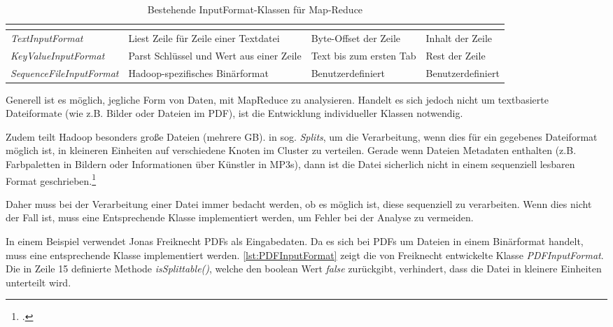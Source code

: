 \begin{table}[h]
	\centering
	\begin{tabularx}{\textwidth}{| l | X | X | X |}
		\hline
		\rowcolor[HTML]{3531FF} 
		\multicolumn{1}{|l|}{\cellcolor[HTML]{4F88BB}{\color[HTML]{FFFFFF} {\bf Klasse}}} & \multicolumn{1}{l|}{\cellcolor[HTML]{4F88BB}{\color[HTML]{FFFFFF} {\bf Beschreibung}}} & \multicolumn{1}{l|}{\cellcolor[HTML]{4F88BB}{\color[HTML]{FFFFFF} {\bf Key}}} & \multicolumn{1}{l|}{\cellcolor[HTML]{4F88BB}{\color[HTML]{FFFFFF} {\bf Value}}} \\ \hline
		\textit{TextInputFormat} & Liest Zeile für Zeile einer Textdatei & Byte-Offset der Zeile & Inhalt der Zeile \\  \hline
		\textit{KeyValueInputFormat} & Parst Schlüssel und Wert aus einer Zeile & Text bis zum ersten Tab & Rest der Zeile \\ \hline
		\textit{SequenceFileInputFormat} & Hadoop-spezifisches Binärformat & Benutzerdefiniert & Benutzerdefiniert \\  \hline
	\end{tabularx}
	\caption{Bestehende InputFormat-Klassen für Map-Reduce\footnotemark}
	\label{tbl:InputFormatKlasses}
\end{table}

Generell ist es möglich, jegliche Form von Daten, mit MapReduce zu analysieren. Handelt es sich jedoch nicht um textbasierte Dateiformate (wie z.B. Bilder oder Dateien im \ac{PDF}), ist die Entwicklung individueller Klassen notwendig.

Zudem teilt Hadoop besonders große Dateien (mehrere \ac{GB}). in sog. \textit{Splits}, um die Verarbeitung, wenn dies für ein gegebenes Dateiformat möglich ist, in kleineren Einheiten auf verschiedene Knoten im Cluster zu verteilen. \flqq Gerade wenn Dateien Metadaten enthalten (z.B. Farbpaletten in Bildern oder Informationen über Künstler in MP3s), dann ist die Datei sicherlich nicht in einem sequenziell lesbaren Format geschrieben.\frqq\footcite[S. 110]{Freiknecht.2014}

Daher muss bei der Verarbeitung einer Datei immer bedacht werden, ob es möglich ist, diese sequenziell zu verarbeiten. Wenn dies nicht der Fall ist, muss eine Entsprechende Klasse implementiert werden, um Fehler bei der Analyse zu vermeiden.

In einem Beispiel verwendet Jonas Freiknecht \acp{PDF} als Eingabedaten. Da es sich bei \acp{PDF} um Dateien in einem Binärformat handelt, muss eine entsprechende Klasse implementiert werden. \autoref{lst:PDFInputFormat} zeigt die von Freiknecht entwickelte Klasse \textit{PDFInputFormat}. Die in Zeile 15 definierte Methode \textit{isSplittable()}, welche den boolean Wert \textit{false} zurückgibt, verhindert, dass die Datei in kleinere Einheiten unterteilt wird. \\

